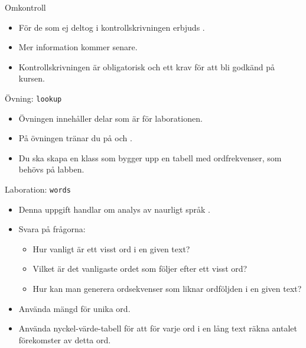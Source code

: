 


\begin{Slide}{Omkontroll}
\begin{itemize}
\item För de som ej deltog i kontrollskrivningen erbjuds . 
\item Mer information kommer senare.
\item Kontrollskrivningen är obligatorisk och ett krav för att bli godkänd på kursen.
\end{itemize}  
\end{Slide}



\begin{Slide}{Övning: \texttt{lookup}}
\begin{itemize}\SlideFontSmall
  \item Övningen innehåller delar som är  för laborationen.
  \item På övningen tränar du på  och .
  \item Du ska skapa en klass  som bygger upp en tabell med ordfrekvenser, som behövs på labben.
\end{itemize}
\end{Slide}

\begin{Slide}{Laboration: \texttt{words}}
\begin{itemize}
  \item Denna uppgift handlar om analys av naurligt språk .
  \item Svara på frågorna:
  \begin{itemize}%
  \item Hur vanligt är ett visst ord i en given text?
  \item Vilket är det vanligaste ordet som följer efter ett visst ord?
  \item Hur kan man generera ordsekvenser som liknar ordföljden i en given text?
  \end{itemize}
\item Använda mängd för unika ord.
\item Använda nyckel-värde-tabell för att för varje ord i en lång text räkna antalet förekomster av detta ord.
\end{itemize}
\end{Slide}


